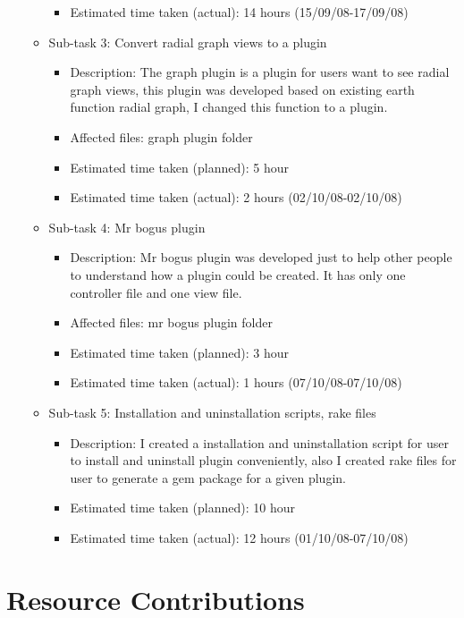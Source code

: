 \documentclass{article}
\begin{document}
\begin{itemize}
\begin{itemize}
\begin{itemize}
					\item Estimated time taken (actual): 14 hours (15/09/08-17/09/08)
				 \end{itemize}
		 \item Sub-task 3: Convert radial graph views to a plugin
	            \begin{itemize}
				    \item Description: The graph plugin is a plugin for users want to see radial graph views, this plugin was developed based on existing earth function radial graph, I changed this function to a plugin.
					\item Affected files: graph plugin folder
					\item Estimated time taken (planned): 5 hour
					\item Estimated time taken (actual): 2 hours (02/10/08-02/10/08)
				 \end{itemize}
		 \item Sub-task 4: Mr bogus plugin
	            \begin{itemize}
				    \item Description: Mr bogus plugin was developed just to help other people to understand how a plugin could be created. It has only one controller file and one view file.
					\item Affected files: mr bogus plugin folder
					\item Estimated time taken (planned): 3 hour
					\item Estimated time taken (actual): 1 hours (07/10/08-07/10/08)
			\end{itemize}
		\item Sub-task 5: Installation and uninstallation scripts, rake files
	            \begin{itemize}
				    \item Description: I created a installation and uninstallation script for user to install and uninstall plugin conveniently, also I created rake files for user to generate a gem package for a given plugin.
					\item Estimated time taken (planned): 10 hour
					\item Estimated time taken (actual): 12 hours (01/10/08-07/10/08)
				 \end{itemize}
		
	     \end{itemize}
\end{itemize}

\section*{Resource Contributions}
\end{document}
